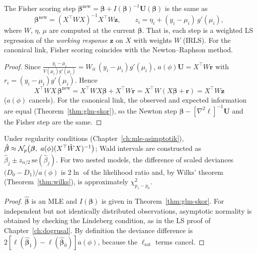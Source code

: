 \documentclass[main.tex]{subfiles}
\begin{document}
\begin{theorem}[Fisher Scoring = Iteratively Reweighted Least Squares]\label{thm:irls}
The Fisher scoring step $\bm\beta^{\text{new}}=\bm\beta+I(\bm\beta)^{-1}\mathbf U(\bm\beta)$ is the same as
\[
\bm\beta^{\text{new}}=(X^\top WX)^{-1}X^\top W\mathbf z,\qquad z_i=\eta_i+(y_i-\mu_i)\,g'(\mu_i),
\]
where $W$, $\eta$, $\mu$ are computed at the current $\bm\beta$. That is, each step is a weighted LS regression of the \emph{working response} $\mathbf z$ on $X$ with weights $W$ (IRLS). For the canonical link, Fisher scoring coincides with the Newton--Raphson method.
\end{theorem}
\begin{proof}
Since $\frac{y_i-\mu_i}{V(\mu_i)g'(\mu_i)}=W_{ii}\,(y_i-\mu_i)g'(\mu_i)$, $a(\phi)\mathbf U=X^\top W\mathbf r$ with $r_i=(y_i-\mu_i)g'(\mu_i)$. Hence
\[
X^\top WX\,\bm\beta^{\text{new}}=X^\top WX\bm\beta+X^\top W\mathbf r=X^\top W(X\bm\beta+\mathbf r)=X^\top W\mathbf z
\]
($a(\phi)$ cancels). For the canonical link, the observed and expected information are equal (Theorem~\ref{thm:glm-skor}), so the Newton step $\bm\beta-[\nabla^2\ell]^{-1}\mathbf U$ and the Fisher step are the same.
\end{proof}

\begin{corollary}\label{cor:glm-asimptotik}
Under regularity conditions (Chapter~\ref{ch:mle-asimptotik}), $\hat{\bm\beta}\approx\Normal_p\big(\bm\beta,\ a(\phi)(X^\top\hat WX)^{-1}\big)$; Wald intervals are constructed as $\hat\beta_j\pm z_{\alpha/2}\,\mathrm{se}(\hat\beta_j)$. For two nested models, the difference of scaled deviances $\big(D_0-D_1\big)/a(\phi)$ is $2\ln$ of the likelihood ratio and, by Wilks' theorem (Theorem~\ref{thm:wilks}), is approximately $\chi^2_{p_1-p_0}$.
\end{corollary}
\begin{proof}
$\hat{\bm\beta}$ is an MLE and $I(\bm\beta)$ is given in Theorem~\ref{thm:glm-skor}. For independent but not identically distributed observations, asymptotic normality is obtained by checking the Lindeberg condition, as in the LS proof of Chapter~\ref{ch:dogrusal}. By definition the deviance difference is $2[\ell(\hat{\bm\beta}_1)-\ell(\hat{\bm\beta}_0)]a(\phi)$, because the $\ell_{\text{sat}}$ terms cancel.
\end{proof}
\end{document}
